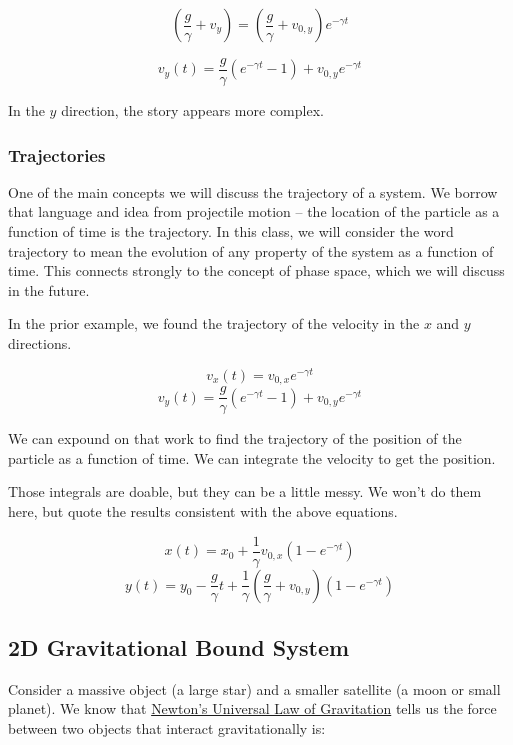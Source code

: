 \documentclass[11pt]{article}
\begin{document}
\[\left(\dfrac{g}{\gamma} + v_y\right) = \left(\dfrac{g}{\gamma} + v_{0,y}\right) e^{-\gamma t}\]

\[v_y(t) = \dfrac{g}{\gamma}\left(e^{-\gamma t} - 1\right) + v_{0,y} e^{-\gamma t}\]

In the \(y\) direction, the story appears more complex.

\subsubsection{Trajectories}\label{trajectories}

One of the main concepts we will discuss the trajectory of a system. We
borrow that language and idea from projectile motion -- the location of
the particle as a function of time is the trajectory. In this class, we
will consider the word trajectory to mean the evolution of any property
of the system as a function of time. This connects strongly to the
concept of phase space, which we will discuss in the future.

In the prior example, we found the trajectory of the velocity in the
\(x\) and \(y\) directions.

\[v_x(t) = v_{0,x} e^{-\gamma t}\]
\[v_y(t) = \dfrac{g}{\gamma}\left(e^{-\gamma t} - 1\right) + v_{0,y} e^{-\gamma t}\]

We can expound on that work to find the trajectory of the position of
the particle as a function of time. We can integrate the velocity to get
the position.

Those integrals are doable, but they can be a little messy. We won't do
them here, but quote the results consistent with the above equations.

\[x(t) = x_0 + \dfrac{1}{\gamma}v_{0,x}\left(1 - e^{-\gamma t}\right)\]
\[y(t) = y_0 - \dfrac{g}{\gamma}t + \dfrac{1}{\gamma}\left(\dfrac{g}{\gamma} + v_{0,y}\right)\left(1 - e^{-\gamma t}\right)\]

    \subsection{2D Gravitational Bound
System}\label{d-gravitational-bound-system}

Consider a massive object (a large star) and a smaller satellite (a moon
or small planet). We know that
\href{https://en.wikipedia.org/wiki/Newton\%27s_law_of_universal_gravitation}{Newton's
Universal Law of Gravitation} tells us the force between two objects
that interact gravitationally is:
\end{document}
